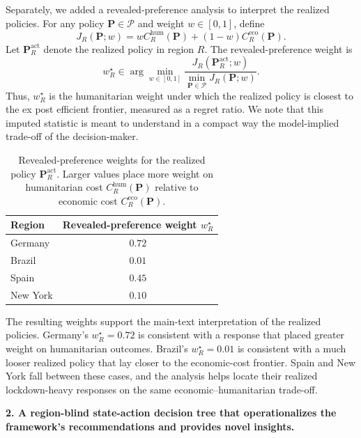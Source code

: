 \documentclass[letterpaper,twoside,11pt]{reviewresponse}
\begin{document}
Separately, we added a revealed-preference analysis to interpret the realized policies. For any policy $\bm{P}\in\mathcal{P}$ and weight $w\in[0,1]$, define
\[
J_R(\bm{P};w)
=
w C_R^{\mathrm{hum}}(\bm{P})
+(1-w)C_R^{\mathrm{eco}}(\bm{P}).
\]
Let $\bm{P}_R^{\mathrm{act}}$ denote the realized policy in region $R$. The revealed-preference weight is
\[
w_R^\star
\in
\arg\min_{w\in[0,1]}
\frac{J_R(\bm{P}_R^{\mathrm{act}};w)}
{\min_{\bm{P}\in\mathcal{P}} J_R(\bm{P};w)}.
\]
Thus, $w_R^\star$ is the humanitarian weight under which the realized policy is closest to the ex post efficient frontier, measured as a regret ratio. We note that this imputed statistic is meant to understand in a compact way the model-implied trade-off of the decision-maker.

\begin{table}[h!]
	\centering
	\small
	\begin{tabular}{|l|c|}
		\hline
		\textbf{Region} & \textbf{Revealed-preference weight $w_R^\star$} \\\hline
		Germany  & $0.72$ \\
		Brazil   & $0.01$ \\
		Spain    & $0.45$ \\
		New York & $0.10$ \\\hline
	\end{tabular}
	\caption{Revealed-preference weights for the realized policy $\bm{P}_R^{\mathrm{act}}$. Larger values place more weight on humanitarian cost $C_R^{\mathrm{hum}}(\bm{P})$ relative to economic cost $C_R^{\mathrm{eco}}(\bm{P})$.}
	\label{tab:revealed_preference_weights_r2}
\end{table}

The resulting weights support the main-text interpretation of the realized policies. Germany's $w_R^\star=0.72$ is consistent with a response that placed greater weight on humanitarian outcomes. Brazil's $w_R^\star=0.01$ is consistent with a much looser realized policy that lay closer to the economic-cost frontier. Spain and New York fall between these cases, and the analysis helps locate their realized lockdown-heavy responses on the same economic--humanitarian trade-off. 

\textbf{2. A region-blind state-action decision tree that operationalizes the framework's recommendations and provides novel insights.}
\end{document}

